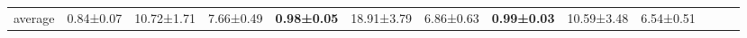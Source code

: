\documentclass[11pt]{article}
\theoremstyle{plain}
\theoremstyle{remark}
\begin{document}
\begin{table}[t]
\begin{center}
\begin{small}
\begin{sc}
\begin{adjustbox}{width=1\textwidth}
\begin{tabular}{ccccccccccclll}
\multicolumn{2}{c|}{average}                             & 0.84±0.07 & 10.72±1.71 & \multicolumn{1}{c|}{7.66±0.49} & \textbf{0.98±0.05} & 18.91±3.79 & \multicolumn{1}{c|}{6.86±0.63} & \textbf{0.99±0.03} & 10.59±3.48   & 6.54±0.51                      &                               &                                &                               \\ \cline{1-11}
\end{tabular}
\end{adjustbox}
\label{main-result-table-1}
\end{sc}
\end{small}
\end{center}
\end{table}

\end{document}
